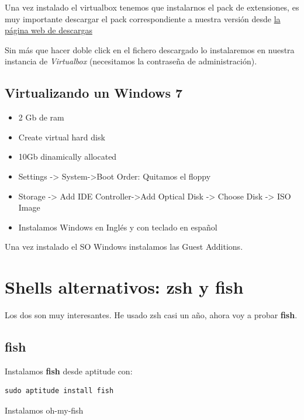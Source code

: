 \documentclass[12pt,spanish,]{article}
\providecommand{\tightlist}{%
  \setlength{\itemsep}{0pt}\setlength{\parskip}{0pt}}
\begin{document}
Una vez instalado el virtualbox tenemos que instalarnos el pack de
extensiones, es muy importante descargar el pack correspondiente a
nuestra versión desde
\href{https://www.virtualbox.org/wiki/Downloads?}{la página web de
descargas}

Sin más que hacer doble click en el fichero descargado lo instalaremos
en nuestra instancia de \emph{Virtualbox} (necesitamos la contraseña de
administración).

\subsection{Virtualizando un Windows
7}\label{virtualizando-un-windows-7}

\begin{itemize}
\tightlist
\item
  2 Gb de ram
\item
  Create virtual hard disk
\item
  10Gb dinamically allocated
\item
  Settings -\textgreater{} System-\textgreater{}Boot Order: Quitamos el
  floppy
\item
  Storage -\textgreater{} Add IDE Controller-\textgreater{}Add Optical
  Disk -\textgreater{} Choose Disk -\textgreater{} ISO Image
\item
  Instalamos Windows en Inglés y con teclado en español
\end{itemize}

Una vez instalado el SO Windows instalamos las Guest Additions.

\section{Shells alternativos: zsh y
fish}\label{shells-alternativos-zsh-y-fish}

Los dos son muy interesantes. He usado zsh casi un año, ahora voy a
probar \textbf{fish}.

\subsection{fish}\label{fish}

Instalamos \textbf{fish} desde aptitude con:

\begin{verbatim}
sudo aptitude install fish
\end{verbatim}

Instalamos oh-my-fish
\end{document}
